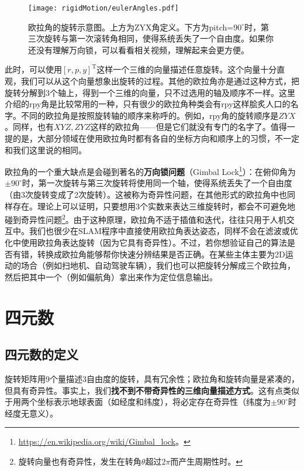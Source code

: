 \begin{figure}[!t]
	\centering
	\texttt{[image: rigidMotion/eulerAngles.pdf]}
	\caption{欧拉角的旋转示意图。上方为ZYX角定义。下方为pitch=$90^\circ$时，第三次旋转与第一次滚转角相同，使得系统丢失了一个自由度。如果你还没有理解万向锁，可以看看相关视频，理解起来会更方便。}
	\label{fig:eulerAngles}
\end{figure}

此时，可以使用$[r,p,y]^\mathrm{T}$这样一个三维的向量描述任意旋转。这个向量十分直观，我们可以从这个向量想象出旋转的过程。其他的欧拉角亦是通过这种方式，把旋转分解到3个轴上，得到一个三维的向量，只不过选用的轴及顺序不一样。这里介绍的rpy角是比较常用的一种，只有很少的欧拉角种类会有rpy这样脍炙人口的名字。不同的欧拉角是按照旋转轴的顺序来称呼的。例如，rpy角的旋转顺序是$ZYX$。同样，也有$XYZ, ZYZ$这样的欧拉角——但是它们就没有专门的名字了。值得一提的是，大部分领域在使用欧拉角时都有各自的坐标方向和顺序上的习惯，不一定和我们这里说的相同。

欧拉角的一个重大缺点是会碰到著名的\textbf{万向锁问题}（Gimbal Lock\footnote{\url{https://en.wikipedia.org/wiki/Gimbal_lock}。}）：在俯仰角为$\pm 90 ^\circ $时，第一次旋转与第三次旋转将使用同一个轴，使得系统丢失了一个自由度（由3次旋转变成了2次旋转）。这被称为奇异性问题，在其他形式的欧拉角中也同样存在。理论上可以证明，只要想用3个实数来表达三维旋转时，都会不可避免地碰到奇异性问题\footnote{旋转向量也有奇异性，发生在转角$\theta$超过$2\pi$而产生周期性时。}。由于这种原理，欧拉角不适于插值和迭代，往往只用于人机交互中。我们也很少在SLAM程序中直接使用欧拉角表达姿态，同样不会在滤波或优化中使用欧拉角表达旋转（因为它具有奇异性）。不过，若你想验证自己的算法是否有错，转换成欧拉角能够帮你快速分辨结果是否正确。在某些主体主要为2D运动的场合（例如扫地机、自动驾驶车辆），我们也可以把旋转分解成三个欧拉角，然后把其中一个（例如偏航角）拿出来作为定位信息输出。

\section{四元数}
\subsection{四元数的定义}
旋转矩阵用9个量描述3自由度的旋转，具有冗余性；欧拉角和旋转向量是紧凑的，但具有奇异性。事实上，我们\textbf{找不到不带奇异性的三维向量描述方式}\textsuperscript{\cite{Stuelpnagel1964}}。这有点类似于用两个坐标表示地球表面（如经度和纬度），将必定存在奇异性（纬度为$\pm 90^\circ$时经度无意义）。

